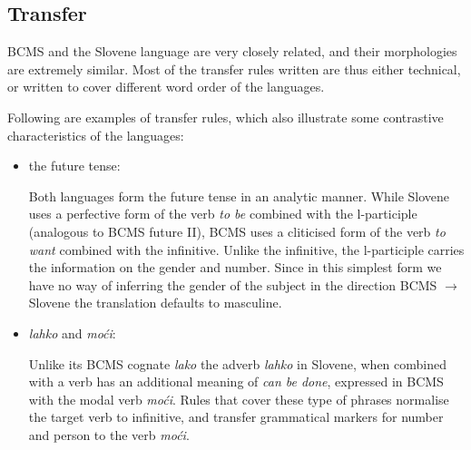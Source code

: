 
\subsection{Transfer}

BCMS and the Slovene language are very closely related, and their
morphologies are extremely similar. Most of the transfer rules written
are thus either technical, or written to cover different word order of
the languages.

Following are examples of transfer rules, which also illustrate some
contrastive characteristics of the languages:

\begin{itemize}
\item the future tense:

Both languages form the future tense in an analytic manner. While Slovene
uses a perfective form of the verb \emph{to be} combined with the l-participle (analogous
to BCMS future II), BCMS uses a cliticised form of the verb \emph{to
  want} combined with the infinitive. Unlike the infinitive, the
l-participle carries the information on the gender and number. Since
in this simplest form we have no way of inferring the gender of the
subject in the direction BCMS $\rightarrow$ Slovene the translation defaults
to masculine.

\item \emph{lahko} and \emph{moći}:

Unlike its BCMS cognate \emph{lako} the adverb \emph{lahko} in
Slovene, when combined with a verb has an additional meaning of \emph{can be
  done}, expressed in BCMS with the modal verb \emph{moći}. Rules that
cover these type of phrases normalise the target verb to infinitive,
and transfer grammatical markers for number and person to the verb \emph{moći}.


\end{itemize}

